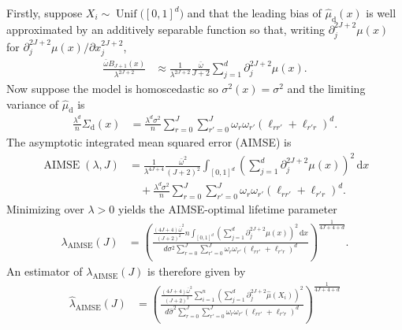\documentclass[11pt,lof]{puthesis}
\newcommand{\rd}{\ensuremath{\mathrm{d}}}
\DeclareMathOperator{\AIMSE}{AIMSE}
\DeclareMathOperator{\Unif}{Unif}
\newcommand{\diff}[1]{\,\mathrm{d}#1}
\theoremstyle{break}
\theoremstyle{proof}
\begin{document}
Firstly, suppose $X_i \sim \Unif\big([0,1]^d\big)$
and that the leading bias of $\hat\mu_\rd(x)$ is well approximated by an
additively separable function so that,
writing $\partial^{2 J + 2}_j \mu(x)$
for $\partial^{2 J + 2}_j \mu(x) / \partial x_j^{2 J + 2}$,
%
\begin{align*}
  \frac{\bar \omega B_{J+1}(x)}{\lambda^{2 J + 2}}
  &\approx
  \frac{1}{\lambda^{2 J + 2}}
  \frac{\bar \omega }{J + 2}
  \sum_{j=1}^d
  \partial^{2 J + 2}_j \mu(x).
\end{align*}
%
Now suppose the model is homoscedastic so $\sigma^2(x) = \sigma^2$ and
the limiting variance of $\hat\mu_\rd$ is
%
\begin{align*}
  \frac{\lambda^d}{n}
  \Sigma_\rd(x)
  &=
  \frac{\lambda^d \sigma^2}{n}
  \sum_{r=0}^{J}
  \sum_{r'=0}^{J}
  \omega_r
  \omega_{r'}
  \left( \ell_{r r'} + \ell_{r' r} \right)^d.
\end{align*}
%
The asymptotic integrated mean squared error (AIMSE) is
%
\begin{align*}
  \AIMSE(\lambda, J)
  &=
  \frac{1}{\lambda^{4 J + 4}}
  \frac{\bar \omega^2}{(J + 2)^2}
  \int_{[0,1]^d}
  \left(
    \sum_{j=1}^d
    \partial^{2 J + 2}_j \mu(x)
  \right)^2
  \diff x \\
  &\quad+
  \frac{\lambda^d \sigma^2}{n}
  \sum_{r=0}^{J}
  \sum_{r'=0}^{J}
  \omega_r
  \omega_{r'}
  \left( \ell_{r r'} + \ell_{r' r} \right)^d.
\end{align*}
%
Minimizing over $\lambda > 0$ yields the AIMSE-optimal lifetime parameter
%
\begin{align*}
  \lambda_{\AIMSE}(J)
  &=
  \left(
    \frac{
      \frac{(4 J + 4) \bar \omega^2}{(J + 2)^2}
      n \int_{[0,1]^d}
      \left(
        \sum_{j=1}^d
        \partial^{2 J + 2}_j \mu(x)
      \right)^2
      \diff x
    }{
      d \sigma^2
      \sum_{r=0}^{J}
      \sum_{r'=0}^{J}
      \omega_r
      \omega_{r'}
      \left( \ell_{r r'} + \ell_{r' r} \right)^d
    }
  \right)^{\frac{1}{4 J + 4 + d}}.
\end{align*}
%
An estimator of $\lambda_{\AIMSE}(J)$ is therefore given by
%
\begin{align*}
  \hat\lambda_{\AIMSE}(J)
  &=
  \left(
    \frac{
      \frac{(4 J + 4) \bar \omega^2}{(J + 2)^2}
      \sum_{i=1}^n
      \left(
        \sum_{j=1}^d
        \partial^{2 J + 2}_j \hat\mu(X_i)
      \right)^2
    }{
      d \hat\sigma^2
      \sum_{r=0}^{J}
      \sum_{r'=0}^{J}
      \omega_r
      \omega_{r'}
      \left( \ell_{r r'} + \ell_{r' r} \right)^d
    }
  \right)^{\frac{1}{4 J + 4 + d}}
\end{align*}
\end{document}
